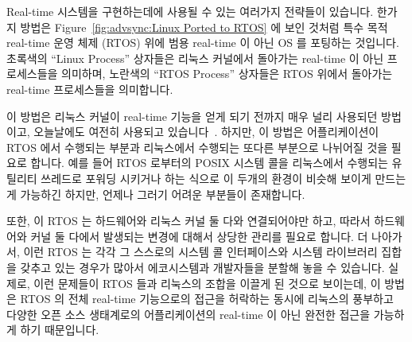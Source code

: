 Real-time 시스템을 구현하는데에 사용될 수 있는 여러가지 전략들이 있습니다.
한가지 방법은
Figure~\ref{fig:advsync:Linux Ported to RTOS} 에 보인 것처럼 특수 목적 real-time
운영 체제 (RTOS) 위에 범용 real-time 이 아닌 OS 를 포팅하는 것입니다.
초록색의 ``Linux Process'' 상자들은 리눅스 커널에서 돌아가는 real-time 이 아닌
프로세스들을 의미하며, 노란색의 ``RTOS Process'' 상자들은 RTOS 위에서 돌아가는
real-time 프로세스들을 의미합니다.

이 방법은 리눅스 커널이 real-time 기능을 얻게 되기 전까지 매우 널리 사용되던
방법이고, 오늘날에도 여전히 사용되고
있습니다~\cite{Xenomai2014,VictorYodaiken2004a}.
하지만, 이 방법은 어플리케이션이 RTOS 에서 수행되는 부분과 리눅스에서 수행되는
또다른 부분으로 나뉘어질 것을 필요로 합니다.
예를 들어 RTOS 로부터의 POSIX 시스템 콜을 리눅스에서 수행되는 유틸리티 쓰레드로
포워딩 시키거나 하는 식으로 이 두개의 환경이 비슷해 보이게 만드는게 가능하긴
하지만, 언제나 그러기 어려운 부분들이 존재합니다.

또한, 이 RTOS 는 하드웨어와 리눅스 커널 둘 다와 연결되어야만 하고, 따라서
하드웨어와 커널 둘 다에서 발생되는 변경에 대해서 상당한 관리를 필요로 합니다.
더 나아가서, 이런 RTOS 는 각각 그 스스로의 시스템 콜 인터페이스와 시스템
라이브러리 집합을 갖추고 있는 경우가 많아서 에코시스템과 개발자들을 분할해 놓을
수 있습니다.
실제로, 이런 문제들이 RTOS 들과 리눅스의 조합을 이끌게 된 것으로 보이는데, 이
방법은 RTOS 의 전체 real-time 기능으로의 접근을 허락하는 동시에 리눅스의
풍부하고 다양한 오픈 소스 생태계로의 어플리케이션의 real-time 이 아닌 완전한
접근을 가능하게 하기 때문입니다.
\iffalse

